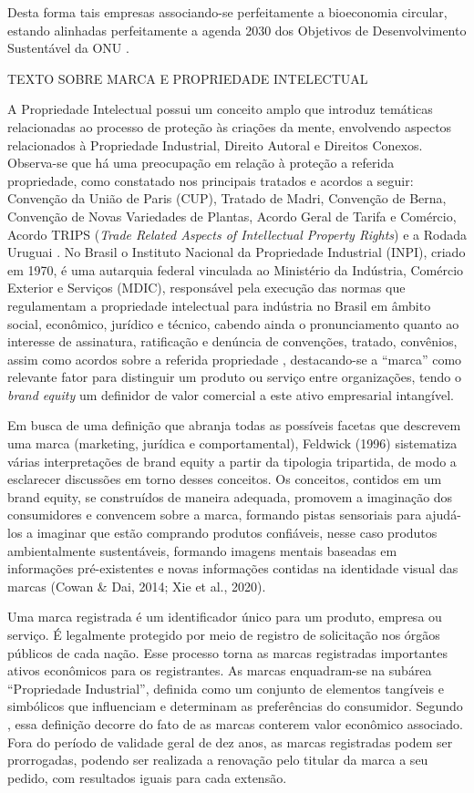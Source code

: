 Desta forma tais empresas associando-se perfeitamente a bioeconomia circular, estando alinhadas perfeitamente a agenda 2030 dos Objetivos de Desenvolvimento Sustentável da ONU \cite{Mundo2016}.


TEXTO SOBRE MARCA E PROPRIEDADE INTELECTUAL 

A Propriedade Intelectual possui um conceito amplo que introduz temáticas relacionadas ao processo de proteção às criações da mente, envolvendo aspectos relacionados à Propriedade Industrial, Direito Autoral e Direitos Conexos. Observa-se que há uma preocupação em relação à proteção a referida propriedade, como constatado nos principais tratados e acordos a seguir: Convenção da União de Paris (CUP), Tratado de Madri, Convenção de Berna, Convenção de Novas Variedades de Plantas, Acordo Geral de Tarifa e Comércio, Acordo TRIPS (\textit{Trade Related Aspects of Intellectual Property Rights}) e a Rodada Uruguai \cite{FERRAZ2008}. No Brasil o Instituto Nacional da Propriedade Industrial (INPI), criado em 1970, é uma autarquia federal vinculada ao Ministério da Indústria, Comércio Exterior e Serviços (MDIC), responsável pela execução das normas que regulamentam a propriedade intelectual para indústria no Brasil em âmbito social, econômico, jurídico e técnico, cabendo ainda o pronunciamento quanto ao interesse de assinatura, ratificação e denúncia de convenções, tratado, convênios, assim como acordos sobre a referida propriedade \cite{INPI2020}, destacando-se a “marca” como relevante fator para distinguir um produto ou serviço entre organizações, tendo o \textit{brand equity} um definidor de valor comercial a este ativo empresarial intangível.

Em busca de uma definição que abranja todas as possíveis facetas que descrevem uma marca (marketing, jurídica e comportamental), Feldwick (1996) sistematiza várias interpretações de brand equity a partir da tipologia tripartida, de modo a esclarecer discussões em torno desses conceitos. Os conceitos, contidos em um brand equity, se construídos de maneira adequada, promovem a imaginação dos consumidores e convencem sobre a marca, formando pistas sensoriais para ajudá-los a imaginar que estão comprando produtos confiáveis, nesse caso produtos ambientalmente sustentáveis, formando imagens mentais baseadas em informações pré-existentes e novas informações contidas na identidade visual das marcas (Cowan & Dai, 2014; Xie et al., 2020). 

Uma marca registrada é um identificador único para um produto, empresa ou serviço. É legalmente protegido por meio de registro de solicitação nos órgãos públicos de cada nação. Esse processo torna as marcas registradas importantes ativos econômicos para os registrantes. As marcas enquadram-se na subárea “Propriedade Industrial”, definida como um conjunto de elementos tangíveis e simbólicos que influenciam e determinam as preferências do consumidor. Segundo \cite{Mourad2014}, essa definição decorre do fato de as marcas conterem valor econômico associado. Fora do período de validade geral de dez anos, as marcas registradas podem ser prorrogadas, podendo ser realizada a renovação pelo titular da marca a seu pedido, com resultados iguais para cada extensão.

